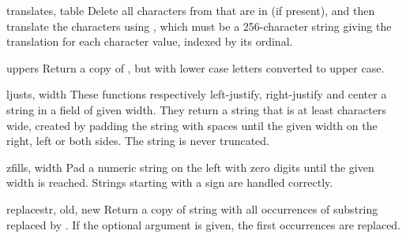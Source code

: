 \begin{funcdesc}{translate}{s, table}
  Delete all characters from  that are in  (if 
  present), and then translate the characters using , which 
  must be a 256-character string giving the translation for each
  character value, indexed by its ordinal.
\end{funcdesc}

\begin{funcdesc}{upper}{s}
  Return a copy of , but with lower case letters converted to
  upper case.
\end{funcdesc}

\begin{funcdesc}{ljust}{s, width}
  These functions respectively left-justify, right-justify and center
  a string in a field of given width.  They return a string that is at
  least  characters wide, created by padding the string
   with spaces until the given width on the right, left or both
  sides.  The string is never truncated.
\end{funcdesc}

\begin{funcdesc}{zfill}{s, width}
  Pad a numeric string on the left with zero digits until the given
  width is reached.  Strings starting with a sign are handled
  correctly.
\end{funcdesc}

\begin{funcdesc}{replace}{str, old, new}
  Return a copy of string  with all occurrences of substring
   replaced by .  If the optional argument
   is given, the first  occurrences are
  replaced.
\end{funcdesc}

